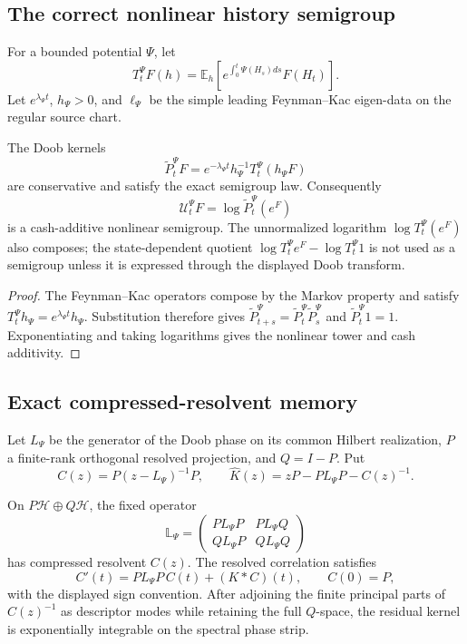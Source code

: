\subsection{The correct nonlinear history semigroup}

For a bounded potential \(\Psi\), let
\[
 T_t^\Psi F(h)=\mathbb E_h\left[
 e^{\int_0^t\Psi(H_s)ds}F(H_t)\right].
\]
Let \(e^{\lambda_\Psi t}\), \(h_\Psi>0\), and \(\ell_\Psi\) be the simple
leading Feynman--Kac eigen-data on the regular source chart.

\begin{theorem}
\label{thm:r10-a4-doob}
The Doob kernels
\[
 \widetilde P_t^\Psi F
 =e^{-\lambda_\Psi t}h_\Psi^{-1}T_t^\Psi(h_\Psi F)
\]
are conservative and satisfy the exact semigroup law.  Consequently
\[
 \mathcal U_t^\Psi F=\log\widetilde P_t^\Psi(e^F)
\]
is a cash-additive nonlinear semigroup.  The unnormalized logarithm
\(\log T_t^\Psi(e^F)\) also composes; the state-dependent quotient
\(\log T_t^\Psi e^F-\log T_t^\Psi1\) is not used as a semigroup unless it is
expressed through the displayed Doob transform.
\end{theorem}

\begin{proof}
The Feynman--Kac operators compose by the Markov property and satisfy
\(T_t^\Psi h_\Psi=e^{\lambda_\Psi t}h_\Psi\).  Substitution therefore gives
\(\widetilde P_{t+s}^\Psi=
\widetilde P_t^\Psi\widetilde P_s^\Psi\) and
\(\widetilde P_t^\Psi1=1\).  Exponentiating and taking logarithms gives the
nonlinear tower and cash additivity.
\end{proof}

\subsection{Exact compressed-resolvent memory}

Let \(L_\Psi\) be the generator of the Doob phase on its common Hilbert
realization, \(P\) a finite-rank orthogonal resolved projection, and
\(Q=I-P\).  Put
\[
 C(z)=P(z-L_\Psi)^{-1}P,
 \qquad
 \widehat K(z)=zP-PL_\Psi P-C(z)^{-1}.
\]

\begin{theorem}
\label{thm:r10-a4-memory}
On \(P\mathcal H\oplus Q\mathcal H\), the fixed operator
\[
 \mathbb L_\Psi=
 \begin{pmatrix}
 PL_\Psi P&PL_\Psi Q\\
 QL_\Psi P&QL_\Psi Q
 \end{pmatrix}
\]
has compressed resolvent \(C(z)\).  The resolved correlation satisfies
\[
 C'(t)=PL_\Psi P\,C(t)+(K*C)(t),
 \qquad C(0)=P,
\]
with the displayed sign convention.  After adjoining the finite principal
parts of \(C(z)^{-1}\) as descriptor modes while retaining the full
\(Q\)-space, the residual kernel is exponentially integrable on the spectral
phase strip.
\end{theorem}

